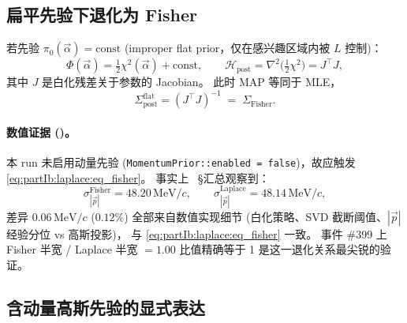 \subsection{扁平先验下退化为 Fisher}
\label{sec:partIb:laplace:flat}

若先验 $\pi_0(\vec\alpha)=\mathrm{const}$ (improper flat prior，仅在感兴趣区域内被 $L$ 控制)：
\begin{equation}
  \Phi(\vec\alpha) = \tfrac12 \chi^2(\vec\alpha)+\mathrm{const},
  \qquad
  \mathcal H_{\mathrm{post}}
  = \nabla^2\bigl(\tfrac12\chi^2\bigr)
  = J^{\top}J,
  \label{eq:partIb:laplace:flat}
\end{equation}
其中 $J$ 是白化残差关于参数的 Jacobian。
此时 MAP 等同于 MLE，
\begin{equation}
  \Sigma_{\mathrm{post}}^{\mathrm{flat}}
  = (J^{\top}J)^{-1}
  \;=\;\Sigma_{\mathrm{Fisher}}.
  \label{eq:partIb:laplace:eq_fisher}
\end{equation}

\paragraph{数值证据 (\StatusReport)。}
本 run 未启用动量先验 (\texttt{MomentumPrior::enabled = false})，故应触发
\eqref{eq:partIb:laplace:eq_fisher}。
事实上 \StatusReport\ §汇总观察到：
\begin{equation}
  \sigma^{\mathrm{Fisher}}_{|\vec p|} = 48.20\,\mathrm{MeV}/c,
  \qquad
  \sigma^{\mathrm{Laplace}}_{|\vec p|}=48.14\,\mathrm{MeV}/c,
  \label{eq:partIb:laplace:numbers}
\end{equation}
差异 $0.06\,\mathrm{MeV}/c$ ($0.12\%$) 全部来自数值实现细节
(白化策略、SVD 截断阈值、$|\vec p|$ 经验分位 vs 高斯投影)，
与 \eqref{eq:partIb:laplace:eq_fisher} 一致。
事件 \#399 上 Fisher 半宽 / Laplace 半宽 $=1.00$ 比值精确等于 1
是这一退化关系最尖锐的验证。

\subsection{含动量高斯先验的显式表达}
\label{sec:partIb:laplace:prior}

